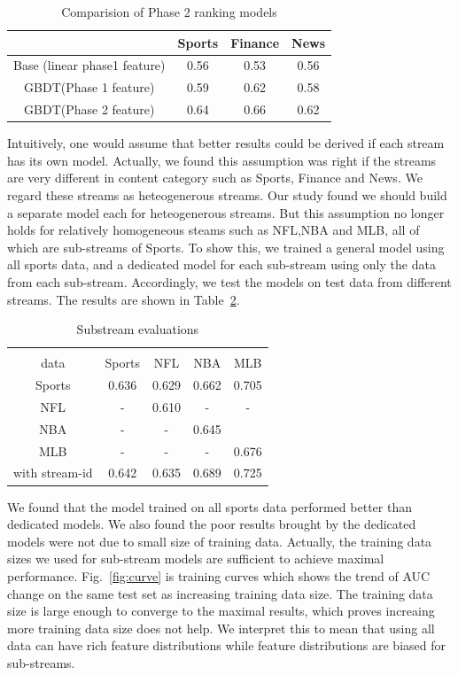 \begin{table}
\caption{Comparision of Phase 2 ranking models}
\begin{tabular}{|c|c|c|c|}\hline
             & Sports & Finance & News \\ \hline
Base (linear phase1 feature) & 0.56 & 0.53 & 0.56 \\ \hline 
GBDT(Phase 1 feature)  & 0.59& 0.62& 0.58 \\ \hline
GBDT(Phase 2 feature) & 0.64 & 0.66 & 0.62 \\ \hline
\end{tabular}

\label{phase2sum}
\end{table}


Intuitively, one would assume that better results could be derived if each 
stream has its own model. Actually, we found this assumption was right if the 
streams are very different in content category such as Sports, Finance and News. 
We regard these streams as heteogenerous streams. Our study found we should build a separate 
model each for heteogenerous streams. But this assumption no longer holds for 
relatively homogeneous steams such as NFL,NBA and MLB, all of which are 
sub-streams of Sports.  To show this, we trained a general model using all 
sports data, and a dedicated model for each sub-stream using only the data 
from each sub-stream. Accordingly, we test the models on test data from 
different streams. The results are shown in Table~\ref{tab:substream}. 

\begin{table}
\caption{Substream evaluations}
\begin{tabular}{|c|c|c|c|c|} \hline
    \diaghead{\theadfont training  test data}{training \\ data}{test  data}   & Sports & NFL & NBA & MLB \\ \hline
    Sports & 0.636 &0.629 &0.662 &0.705 \\ \hline
    NFL & - & 0.610 & - & - \\ \hline
    NBA & - & - & 0.645 & \\ \hline
   MLB & - & - & - & 0.676 \\ \hline
   with stream-id  & 0.642  & 0.635 &0.689 & 0.725 \\ \hline
\end{tabular}

\label{tab:substream}
\end{table}

We found that the model trained on all sports data performed better than 
dedicated models. 
 We also found 
the poor results brought by the dedicated models were not due to small size of training data. 
Actually, the training data sizes we used for sub-stream models are sufficient 
to achieve maximal performance. Fig.~\ref{fig:curve}  is  
training curves which shows the trend of AUC change on the same test set as 
increasing training data size. The training data size is large enough to converge to
the maximal results, which proves increaing more training data size does not 
help. We interpret this to mean that using all data can have rich feature 
distributions while feature distributions are biased for sub-streams.
 

